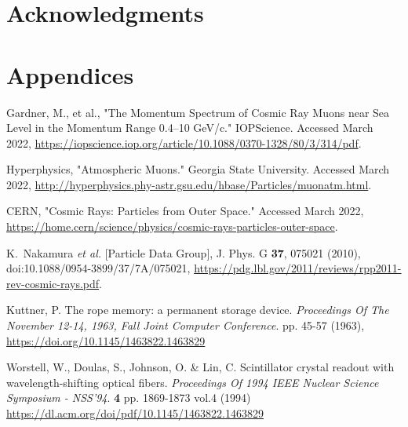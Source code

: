 \documentclass[aps,prl,reprint,groupedaddress]{revtex4-1}
\begin{document}

\section{Acknowledgments}


\clearpage
\section{Appendices}


\begin{thebibliography}{99}
Gardner, M., et al., "The Momentum Spectrum of Cosmic Ray Muons near Sea Level in the Momentum Range 0.4--10 GeV/c." IOPScience. Accessed March 2022,
\url{https://iopscience.iop.org/article/10.1088/0370-1328/80/3/314/pdf}.

Hyperphysics, "Atmospheric Muons." Georgia State University. Accessed March 2022,
\url{http://hyperphysics.phy-astr.gsu.edu/hbase/Particles/muonatm.html}.

CERN, "Cosmic Rays: Particles from Outer Space." Accessed March 2022,
\url{https://home.cern/science/physics/cosmic-rays-particles-outer-space}.

K.~Nakamura \textit{et al.} [Particle Data Group], J. Phys. G \textbf{37}, 075021 (2010),
doi:10.1088/0954-3899/37/7A/075021,
\url{https://pdg.lbl.gov/2011/reviews/rpp2011-rev-cosmic-rays.pdf}.



Kuttner, P. The rope memory: a permanent storage device. {\em Proceedings Of The November 12-14, 1963, Fall Joint Computer Conference}. pp. 45-57 (1963), \url{https://doi.org/10.1145/1463822.1463829}


Worstell, W., Doulas, S., Johnson, O. \& Lin, C. Scintillator crystal readout with wavelength-shifting optical fibers. {\em Proceedings Of 1994 IEEE Nuclear Science Symposium - NSS'94}. \textbf{4} pp. 1869-1873 vol.4 (1994)
\url{https://dl.acm.org/doi/pdf/10.1145/1463822.1463829}


\end{thebibliography}
\end{document}
